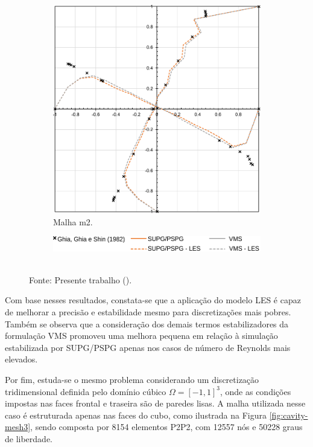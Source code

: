 \begin{figure}[h!]
\begin{subfigure}{0.49\textwidth}
        \includegraphics[width=\linewidth]{Figuras/Cavity/res-m2.pdf}
        \caption{Malha m2.}
    \end{subfigure}
    \begin{subfigure}{0.4\textwidth}
        \includegraphics[width=\linewidth]{Figuras/Cavity/legenda-m1m2.pdf}
    \end{subfigure}
    \\Fonte: Presente trabalho (\the\year).
    \label{fig:cavity-results3}
\end{figure}

Com base nesses resultados, constata-se que a aplicação do modelo LES é capaz de melhorar a precisão e estabilidade mesmo para discretizações mais pobres. Também se observa que a consideração dos demais termos estabilizadores da formulação VMS promoveu uma melhora pequena em relação à simulação estabilizada por SUPG/PSPG apenas nos casos de número de Reynolds mais elevados.

Por fim, estuda-se o mesmo problema considerando um discretização tridimensional definida pelo domínio cúbico $\Omega=[-1,1]^3$, onde as condições impostas nas faces frontal e traseira são de paredes lisas. A malha utilizada nesse caso é estruturada apenas nas faces do cubo, como ilustrada na Figura \ref{fig:cavity-mesh3}, sendo composta por 8154 elementos P2P2, com 12557 nós e 50228 graus de liberdade.

